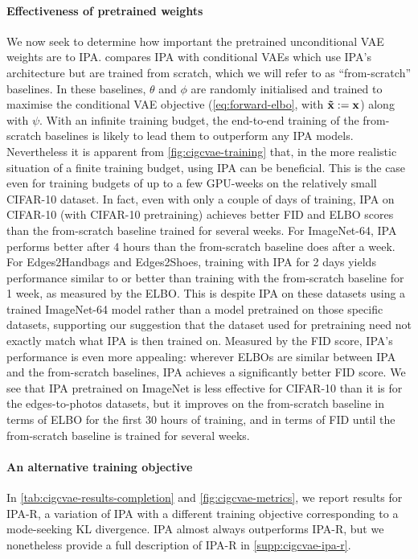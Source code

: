 \paragraph{Effectiveness of pretrained weights}
We now seek to determine how important the pretrained unconditional VAE weights
are to IPA.  compares IPA with conditional VAEs which use IPA's architecture
but are trained from scratch, which we will refer to as ``from-scratch''
baselines. In these baselines, $\theta$ and $\phi$ are randomly initialised and trained to
maximise the conditional VAE objective (\cref{eq:forward-elbo}, with $\mathbf{\tilde{x}}{} := {\mathbf{x}}$) along with
$\psi$.
%
With an infinite training budget, the end-to-end training of the from-scratch
baselines is likely to lead them to outperform any IPA models. Nevertheless it
is apparent from \cref{fig:cigcvae-training} that, in the more realistic situation of a
finite training budget, using IPA can be beneficial. This is the case even for
training budgets of up to a few GPU-weeks on the relatively small CIFAR-10
dataset. In fact, even with only a couple of days of training, IPA on CIFAR-10
(with CIFAR-10 pretraining) achieves better FID and ELBO scores than the
from-scratch baseline trained for several weeks. For ImageNet-64, IPA performs
better after 4 hours than the from-scratch baseline does after a week.
%
For Edges2Handbags and Edges2Shoes, training with IPA for 2 days yields
performance similar to or better than training with the from-scratch baseline
for 1 week, as measured by the ELBO. This is despite IPA on these datasets using
a trained ImageNet-64 model rather than a model pretrained on those specific
datasets, supporting our suggestion that the dataset used for pretraining need
not exactly match what IPA is then trained on.
%
Measured by the FID score, IPA's performance is even more appealing: wherever
ELBOs are similar between IPA and the from-scratch baselines, IPA achieves a
significantly better FID score.
%
We see that IPA pretrained on ImageNet is less effective for CIFAR-10
than it is for the edges-to-photos datasets, but it improves on the from-scratch
baseline in terms of ELBO for the first 30 hours of training, and in terms of
FID until the from-scratch baseline is trained for several weeks.

\paragraph{An alternative training objective}
In \cref{tab:cigcvae-results-completion} and \cref{fig:cigcvae-metrics}, we report results for
IPA-R, a variation of IPA with a different training objective corresponding to a
mode-seeking KL divergence. IPA almost always outperforms IPA-R, but we
nonetheless provide a full description of IPA-R in \cref{supp:cigcvae-ipa-r}.




